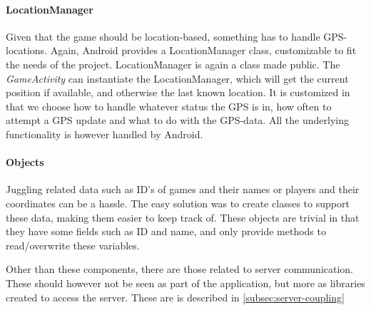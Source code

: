 \paragraph{LocationManager}
Given that the game should be location-based, something has to handle GPS-locations. Again, Android provides a LocationManager class, customizable to fit the needs of the project. LocationManager is again a class made public. The \textit{GameActivity} can instantiate the LocationManager, which will get the current position if available, and otherwise the last known location. It is customized in that we choose how to handle whatever status the GPS is in, how often to attempt a GPS update and what to do with the GPS-data. All the underlying functionality is however handled by Android.

\paragraph{Objects}
Juggling related data such as ID's of games and their names or players and their coordinates can be a hassle. The easy solution was to create classes to support these data, making them easier to keep track of. These objects are trivial in that they have some fields such as ID and name, and only provide methods to read/overwrite these variables.

Other than these components, there are those related to server communication. These should however not be seen as part of the application, but more as libraries created to access the server. These are is described in \ref{subsec:server-coupling}
